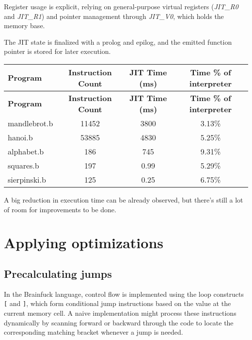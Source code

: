 \par Register usage is explicit, relying on general-purpose virtual registers (\textit{JIT\_R0} and \textit{JIT\_R1}) and pointer management through \textit{JIT\_V0}, which holds the memory base.

\par The JIT state is finalized with a prolog and epilog, and the emitted function pointer is stored for later execution. 

\begin{longtable}{|l|c|c|c|}
\hline
\textbf{Program} & \textbf{Instruction Count} & \textbf{JIT Time (ms)} & \textbf{Time \% of interpreter} \\
\hline
\endfirsthead

\hline
\textbf{Program} & \textbf{Instruction Count} & \textbf{JIT Time (ms)} & \textbf{Time \% of interpreter} \\
\hline
\endhead

\hline
\endfoot

\hline
\endlastfoot

mandlebrot.b  & 11452 & 3800          & 3.13\% \\
hanoi.b       & 53885 & 4830          & 5.25\% \\
alphabet.b    & 186   & 745           & 9.31\% \\
squares.b     & 197   & 0.99          & 5.29\% \\
sierpinski.b  & 125   & 0.25          & 6.75\% \\
\end{longtable}

\par A big reduction in execution time can be already observed, but there's still a lot of room for improvements to be done.

\section{Applying optimizations}
\label{sec:ch2sec3}

\subsection{Precalculating jumps}
\label{subsec:ch2sec3sec1}

\par In the Brainfuck language, control flow is implemented using the loop constructs \texttt{[} and \texttt{]}, which form conditional jump instructions based on the value at the current memory cell. A naive implementation might process these instructions dynamically by scanning forward or backward through the code to locate the corresponding matching bracket whenever a jump is needed.

